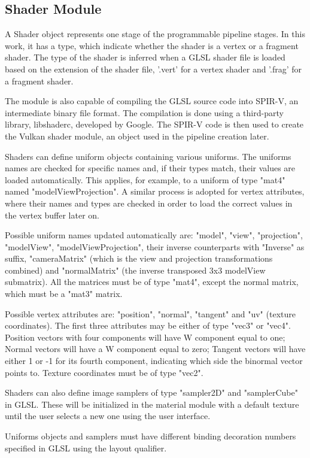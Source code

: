 \subsection{Shader Module}
A Shader object represents one stage of the programmable pipeline stages.
In this work, it has a type, which indicate whether the shader is a vertex or a
fragment shader. The type of the shader is inferred when a GLSL shader file is
loaded based on the extension of the shader file, '.vert' for a vertex shader
and '.frag' for a fragment shader.

The module is also capable of compiling the GLSL source code into SPIR-V, an
intermediate binary file format. The compilation is done using a third-party
library, libshaderc, developed by Google. The SPIR-V code is then used to create
the Vulkan shader module, an object used in the pipeline creation later.

Shaders can define uniform objects containing various uniforms. The uniforms
names are checked for specific names and, if their types match, their values are
loaded automatically. This applies, for example, to a uniform of type "mat4"
named "modelViewProjection". A similar process is adopted for vertex attributes,
where their names and types are checked in order to load the correct values in
the vertex buffer later on.

Possible uniform names updated automatically are: "model", "view", "projection",
"modelView", "modelViewProjection", their inverse counterparts with "Inverse" as
suffix, "cameraMatrix" (which is the view and projection transformations
combined) and "normalMatrix" (the inverse transposed 3x3 modelView submatrix).
All the matrices must be of type "mat4", except the normal matrix, which must be
a "mat3" matrix.

Possible vertex attributes are: "position", "normal", "tangent" and "uv"
(texture coordinates). The first three attributes may be either of type "vec3"
or "vec4". Position vectors with four components will have W component equal to
one; Normal vectors will have a W component equal to zero; Tangent vectors will
have either 1 or -1 for its fourth component, indicating which side the binormal
vector points to. Texture coordinates must be of type "vec2".

Shaders can also define image samplers of type "sampler2D" and "samplerCube" in
GLSL. These will be initialized in the material module with a default texture
until the user selects a new one using the user interface.

Uniforms objects and samplers must have different binding decoration numbers
specified in GLSL using the layout qualifier.
